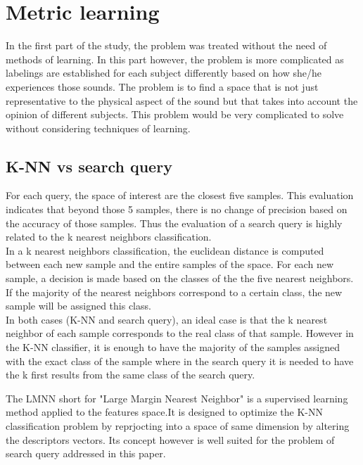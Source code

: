 \documentclass[hidelinks,12pt]{report}
\begin{document}
\section{Metric learning}

In the first part of the study, the problem was treated without the need of methods of learning. In this part however, the problem is more complicated as labelings are established for each subject differently  based on how she/he experiences those sounds. The problem is to find a space that is not just representative to the physical aspect of the sound but that takes into account the opinion of different subjects. This problem would be very complicated to solve without considering techniques of learning. 


\subsection{K-NN vs search query}
For each query, the space of interest are the closest five samples. This evaluation indicates that beyond those 5 samples, there is no change of precision based on the accuracy of those samples. Thus the evaluation of a search query is highly related to the k nearest neighbors classification.\\
In a k nearest neighbors classification, the euclidean distance is computed between each new sample and the entire samples of the space. For each new sample, a decision is made based on the classes of the the five nearest neighbors. If the majority of the nearest neighbors correspond to a certain class, the new sample will be assigned this class.\\
In both cases (K-NN and search query), an ideal case is that the k nearest neighbor of each sample corresponds to the real class of that sample. However in the K-NN classifier, it is enough to have the majority of the samples assigned with the exact class of the sample where in the search query it is needed to have the k first results from the same class of the search query.\par
The LMNN short for "Large Margin Nearest Neighbor" is a supervised learning method applied to the features space.It is designed to optimize the K-NN classification problem by reprjocting into a space of same dimension by altering the descriptors vectors. Its concept however is well suited for the problem of search query addressed in this paper.
\end{document}
